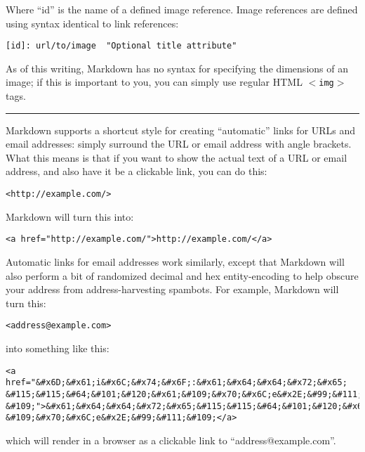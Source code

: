 Where ``id'' is the name of a defined image reference. Image references
are defined using syntax identical to link references:

\begin{verbatim}
[id]: url/to/image  "Optional title attribute"
\end{verbatim}

As of this writing, Markdown has no syntax for specifying the
dimensions of an image; if this is important to you, you can simply
use regular HTML \texttt{$<$img$>$} tags.

\begin{center}\rule{3in}{0.4pt}\end{center}

Markdown supports a shortcut style for creating ``automatic'' links for URLs and email addresses: simply surround the URL or email address with angle brackets. What this means is that if you want to show the actual text of a URL or email address, and also have it be a clickable link, you can do this:

\begin{verbatim}
<http://example.com/>
\end{verbatim}

Markdown will turn this into:

\begin{verbatim}
<a href="http://example.com/">http://example.com/</a>
\end{verbatim}

Automatic links for email addresses work similarly, except that
Markdown will also perform a bit of randomized decimal and hex
entity-encoding to help obscure your address from address-harvesting
spambots. For example, Markdown will turn this:

\begin{verbatim}
<address@example.com>
\end{verbatim}

into something like this:

\begin{verbatim}
<a href="&#x6D;&#x61;i&#x6C;&#x74;&#x6F;:&#x61;&#x64;&#x64;&#x72;&#x65;
&#115;&#115;&#64;&#101;&#120;&#x61;&#109;&#x70;&#x6C;e&#x2E;&#99;&#111;
&#109;">&#x61;&#x64;&#x64;&#x72;&#x65;&#115;&#115;&#64;&#101;&#120;&#x61;
&#109;&#x70;&#x6C;e&#x2E;&#99;&#111;&#109;</a>
\end{verbatim}

which will render in a browser as a clickable link to ``address@example.com''.

